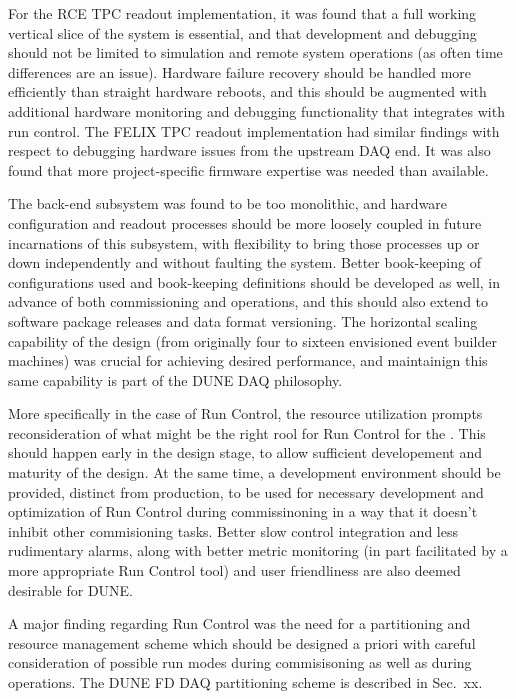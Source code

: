 For the RCE TPC readout implementation, it was found that a full
working vertical slice of the system is essential, and that
development and debugging should not be limited to simulation and
remote system operations (as often time differences are an
issue). Hardware failure recovery should be handled more efficiently
than straight hardware reboots, and this should be augmented with additional
hardware monitoring and debugging functionality that integrates with
run control. The FELIX TPC readout implementation had similar findings with
respect to debugging hardware issues from the upstream DAQ end. It was
also found that more project-specific firmware expertise was needed
than available.

The back-end subsystem was found to be too monolithic, and hardware configuration
and readout processes should be more loosely coupled in future incarnations of
this subsystem, with flexibility to bring those processes up or down
independently and without faulting the system. Better book-keeping of
configurations used and book-keeping definitions should be developed as
well, in advance of both commissioning and operations, and this should also
extend to software package releases and data format versioning. The horizontal
scaling capability of the design (from originally four to sixteen envisioned event
builder machines) was crucial for achieving desired performance, and
maintainign this same capability is part of the DUNE DAQ philosophy.

More specifically in the case of Run Control, the resource utilization
prompts reconsideration of what might be the right rool for Run
Control for the  . This should happen early in
the design stage, to allow sufficient developement and maturity of the
design. At the same time, a development environment should be
provided, distinct from production, to be used for necessary
development and optimization of Run Control during commissinoning in a
way that it doesn't inhibit other commisioning tasks. Better slow
control integration and less rudimentary alarms, along with better
metric monitoring (in part facilitated by a more appropriate Run
Control tool) and user friendliness are also deemed desirable for DUNE. 

A major finding regarding Run Control was the need for a partitioning
and resource management scheme which should be designed a priori with careful
consideration of possible run modes during commisisoning as well as
during operations. The DUNE FD DAQ partitioning scheme is described in
Sec.~xx.

